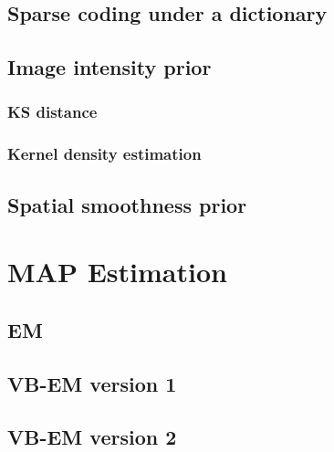 \subsection{Sparse coding under a dictionary}
\subsection{Image intensity prior}
\subsubsection{KS distance}
\subsubsection{Kernel density estimation}
\subsection{Spatial smoothness prior}

\section{MAP Estimation}

\subsection{EM}

\subsection{VB-EM version 1}
\subsection{VB-EM version 2}
